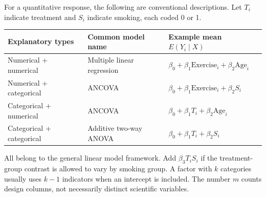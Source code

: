 \documentclass[11pt]{article}
\begin{document}
For a quantitative response, the following are conventional descriptions. Let $T_i$ indicate treatment and $S_i$ indicate smoking, each coded 0 or 1.
\begin{center}\small
\begin{tabular}{p{.20\linewidth}p{.23\linewidth}p{.47\linewidth}}
\toprule
Explanatory types&Common model name&Example mean $E(Y_i\mid X)$\\\midrule
Numerical + numerical&Multiple linear regression&$\beta_0+\beta_1\mathrm{Exercise}_i+\beta_2\mathrm{Age}_i$\\
Numerical + categorical&ANCOVA&$\beta_0+\beta_1\mathrm{Exercise}_i+\beta_2S_i$\\
Categorical + numerical&ANCOVA&$\beta_0+\beta_1T_i+\beta_2\mathrm{Age}_i$\\
Categorical + categorical&Additive two-way ANOVA&$\beta_0+\beta_1T_i+\beta_2S_i$\\\bottomrule
\end{tabular}\end{center}
All belong to the general linear model framework. Add $\beta_3T_iS_i$ if the treatment-group contrast is allowed to vary by smoking group. A factor with $k$ categories usually uses $k-1$ indicators when an intercept is included. The number $m$ counts design columns, not necessarily distinct scientific variables.
\end{document}
